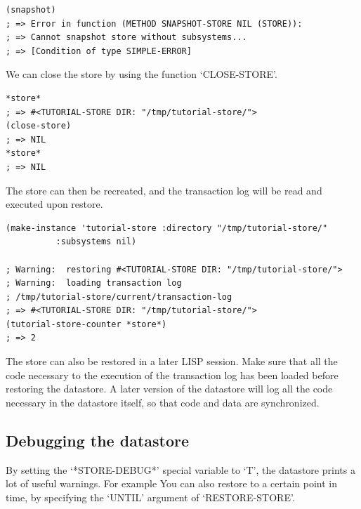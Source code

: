 \begin{Verbatim}[fontsize=\small,frame=leftline,framerule=0.9mm,rulecolor=\color{gray},framesep=5.1mm,xleftmargin=5mm,fontfamily=cmtt]
(snapshot)
; => Error in function (METHOD SNAPSHOT-STORE NIL (STORE)):
; => Cannot snapshot store without subsystems...
; => [Condition of type SIMPLE-ERROR]
\end{Verbatim}
We can close the store by using the function `CLOSE-STORE'.

\begin{Verbatim}[fontsize=\small,frame=leftline,framerule=0.9mm,rulecolor=\color{gray},framesep=5.1mm,xleftmargin=5mm,fontfamily=cmtt]
*store*
; => #<TUTORIAL-STORE DIR: "/tmp/tutorial-store/">
(close-store)
; => NIL
*store*
; => NIL
\end{Verbatim}
The store can then be recreated, and the transaction log will be
read and executed upon restore.

\begin{Verbatim}[fontsize=\small,frame=leftline,framerule=0.9mm,rulecolor=\color{gray},framesep=5.1mm,xleftmargin=5mm,fontfamily=cmtt]
(make-instance 'tutorial-store :directory "/tmp/tutorial-store/"
          :subsystems nil)

; Warning:  restoring #<TUTORIAL-STORE DIR: "/tmp/tutorial-store/">
; Warning:  loading transaction log
; /tmp/tutorial-store/current/transaction-log
; => #<TUTORIAL-STORE DIR: "/tmp/tutorial-store/">
(tutorial-store-counter *store*)
; => 2
\end{Verbatim}
The store can also be restored in a later LISP session. Make sure
that all the code necessary to the execution of the transaction
log has been loaded before restoring the datastore. A later
version of the datastore will log all the code necessary in the
datastore itself, so that code and data are synchronized.


\subsection{ Debugging the datastore}

By setting the `*STORE-DEBUG*' special variable to `T', the
datastore prints a lot of useful warnings. For example
You can also restore to a certain point in time, by specifying the
`UNTIL' argument of `RESTORE-STORE'.

